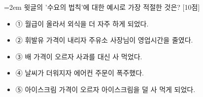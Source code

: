 \documentclass[11pt,a4paper]{article}
\newcommand{\qnum}[1]{%
  \tikz[baseline=(num.base)]{%
    \node[circle, fill=numCircle, text=white, inner sep=0pt,
          minimum size=18pt, font=\small\bfseries] (num) {#1};%
  }%
}
\newcommand{\pts}[1]{%
  \hfill\textcolor{ptsBadge}{[#1점]}%
}
\begin{document}
\vspace{4mm}
\begin{minipage}{\columnwidth}
{\hangindent=2em
\qnum{16}\enspace 윗글의 '수요의 법칙'에 대한 예시로 가장 적절한 것은? \pts{10}
\par}

\vspace{3mm}
\begin{itemize}[leftmargin=2.5em, labelsep=0.3em, label={}, itemsep=4pt, parsep=1pt, topsep=0pt]
  \item ① 월급이 올라서 외식을 더 자주 하게 되었다.
  \item ② 휘발유 가격이 내리자 주유소 사장님이 영업시간을 줄였다.
  \item ③ 배 가격이 오르자 사과를 대신 사 먹었다.
  \item ④ 날씨가 더워지자 에어컨 주문이 폭주했다.
  \item ⑤ 아이스크림 가격이 오르자 아이스크림을 덜 사 먹게 되었다.
\end{itemize}
\end{minipage}
\vspace{4mm}
\end{document}
